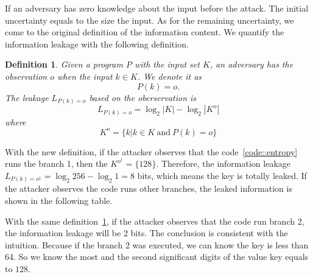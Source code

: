 If an adversary has zero knowledge about the input before the attack. The initial uncertainty
equals to the size the input. As for the remaining uncertainty, we come to the original definition
of the information content.
We quantify the information leakage with the following definition. 

\newtheorem{mydef}{Definition}

\begin{mydef}
\label{def}
Given a program $P$ with the input set $K$, 
an adversary has the observation $o$ when the input $k{\in}K$. 
We denote it as
    $$P(k) = o.$$
The leakage $L_{P(k)=o}$ based on the oberservation is
    $$L_{P(k)=o} = \log_2{|K|} - \log_2{|K^o|}$$
    where
    $$K^o = \{k | k \in K \ \text{and} \ P(k) = o \}$$
\end{mydef}

With the new definition, if the attacker observes that the code~\ref{code::entropy} runs the branch 1, 
then the $K^{o^{1}} = \{128\}$. Therefore, the information leakage $L_{P(k)=o^{1}} = \log_2{256} - \log_2{1} = 8$
bits, which means the key is totally leaked. If the attacker observes the code runs other
branches, the leaked information is shown in the following table.

\begin{table}[h]
    \centering
    \caption{The leaked information by the definition~\ref{def}}
\end{table}

With the same definition~\ref{def}, if the attacker observes that the code run branch 2, the information
leakage will be 2 bits. The conclusion is consistent with the intuition. Because if the branch 2 was
executed, we can know the key is less than 64. So we know the most and the second significant digits of 
the value key equals to $128$.

